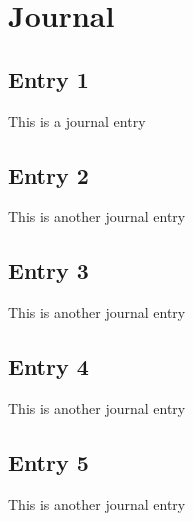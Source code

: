 \section{Journal}

\subsection{Entry 1}
This is a journal entry\autocite{huang_2013_malemale}
\subsection{Entry 2}
This is another journal entry\autocite{huang_2013_malemale}
\subsection{Entry 3}
This is another journal entry\autocite{loos_2009_transnational}
\subsection{Entry 4}
This is another journal entry\autocite{manuel_2020_how}
\subsection{Entry 5}
This is another journal entry\autocite{huang_2013_malemale}
